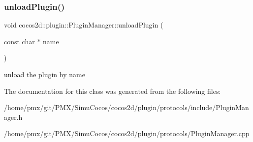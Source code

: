 \subsubsection{\texorpdfstring{unload\+Plugin()}{unloadPlugin()}}
{\footnotesize\ttfamily void cocos2d\+::plugin\+::\+Plugin\+Manager\+::unload\+Plugin (\begin{DoxyParamCaption}\item[{const char $\ast$}]{name }\end{DoxyParamCaption})}

unload the plugin by name 

The documentation for this class was generated from the following files\+:\begin{DoxyCompactItemize}
\item 
/home/pmx/git/\+P\+M\+X/\+Simu\+Cocos/cocos2d/plugin/protocols/include/Plugin\+Manager.\+h\item 
/home/pmx/git/\+P\+M\+X/\+Simu\+Cocos/cocos2d/plugin/protocols/Plugin\+Manager.\+cpp\end{DoxyCompactItemize}
